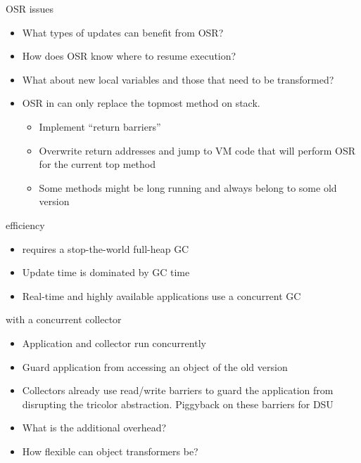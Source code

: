 \begin{frame}[t,fragile]{OSR issues}%
\begin{itemize}
\item What types of updates can benefit from OSR?
\item How does OSR know where to resume execution?
\item What about new local variables and those that need to be transformed?
\item OSR in \JikesRVM{} can only replace the topmost method on stack.
  \begin{itemize}
  \item Implement ``return barriers''
  \item Overwrite return addresses and jump to VM code that will perform
        OSR for the current top method
  \item Some methods might be long running and always belong to some old
        version
  \end{itemize}
\end{itemize}
\end{frame}

\begin{frame}[t,fragile]{\DSU{} efficiency}%
\begin{itemize}
\item \DSU{} requires a stop-the-world full-heap GC
\item Update time is dominated by GC time
\item Real-time and highly available applications use a concurrent GC
\end{itemize}
\end{frame}

\begin{frame}[t,fragile]{\DSU{} with a concurrent collector}%
\begin{itemize}
\item Application and collector run concurrently
\item Guard application from accessing an object of the old version
\item Collectors already use read/write barriers to guard the application
      from disrupting the tricolor abstraction. Piggyback on these
      barriers for DSU
\item What is the additional overhead?
\item How flexible can object transformers be?
\end{itemize}
\end{frame}
